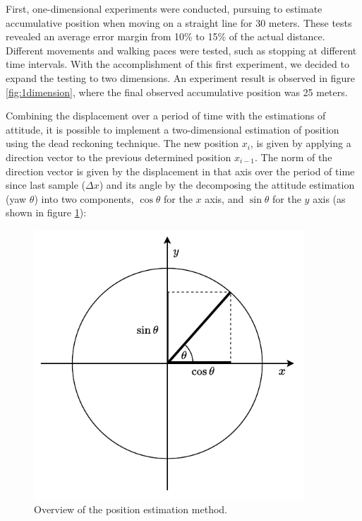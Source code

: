 First, one-dimensional experiments were conducted, pursuing to estimate accumulative position when moving on a straight line for 30 meters. These tests revealed an average error margin from 10\% to 15\% of the actual distance. Different movements and walking paces were tested, such as stopping at different time intervals. With the accomplishment of this first experiment, we decided to expand the testing to two dimensions. An experiment result is observed in figure \ref{fig:1dimension}, where the final observed accumulative position was 25 meters.

Combining the displacement over a period of time with the estimations of attitude, it is possible to implement a two-dimensional estimation of position using the dead reckoning technique. The new position $x_i$, is given by applying a direction vector to the previous determined position $x_{i-1}$. The norm of the direction vector is given by the displacement in that axis over the period of time since last sample ($\Delta x$) and its angle by the decomposing the attitude estimation (yaw $\theta$) into two components, $\cos \theta$ for the $x$ axis, and $\sin \theta$ for the $y$ axis (as shown in figure \ref{fig:trignometric}):

\begin{figure}[!h]
    \centering
    \includegraphics[width=0.9\textwidth]{figures/trignometric.pdf}
    \caption{Overview of the position estimation method.}
    \label{fig:trignometric}
\end{figure}

